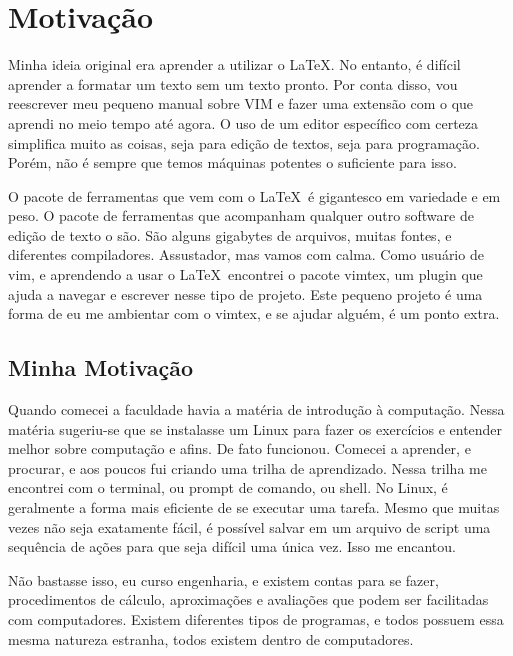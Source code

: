 \section{Motivação}
Minha ideia original era aprender a utilizar o \LaTeX.
No entanto, é difícil aprender a formatar um texto sem um texto pronto.
Por conta disso, vou reescrever meu pequeno manual sobre VIM e fazer uma extensão com o que aprendi no meio tempo até agora.
O uso de um editor específico com certeza simplifica muito as coisas, seja para edição de textos, seja para programação.
Porém, não é sempre que temos máquinas potentes o suficiente para isso.

O pacote de ferramentas que vem com o \LaTeX\ é gigantesco em variedade e em peso.
O pacote de ferramentas que acompanham qualquer outro software de edição de texto o são.
São alguns gigabytes de arquivos, muitas fontes, e diferentes compiladores.
Assustador, mas vamos com calma.
Como usuário de vim, e aprendendo a usar o \LaTeX\, encontrei o pacote vimtex, um plugin que ajuda a
navegar e escrever nesse tipo de projeto.
Este pequeno projeto é uma forma de eu me ambientar com o vimtex, e se ajudar alguém, é um ponto extra.

\subsection{Minha Motivação}
Quando comecei a faculdade havia a matéria de introdução à computação.
Nessa matéria sugeriu-se que se instalasse um Linux para fazer os exercícios e entender melhor sobre computação e afins.
De fato funcionou.
Comecei a aprender, e procurar, e aos poucos fui criando uma trilha de aprendizado.
Nessa trilha me encontrei com o terminal, ou prompt de comando, ou shell.
No Linux, é geralmente a forma mais eficiente de se executar uma tarefa.
Mesmo que muitas vezes não seja exatamente fácil, é possível salvar em um arquivo de script uma sequência de ações para que seja difícil uma única vez.
Isso me encantou.

Não bastasse isso, eu curso engenharia, e existem contas para se fazer,
procedimentos de cálculo, aproximações e avaliações que podem ser facilitadas com computadores.
Existem diferentes tipos de programas, e todos possuem essa mesma natureza estranha, todos existem dentro de computadores.

